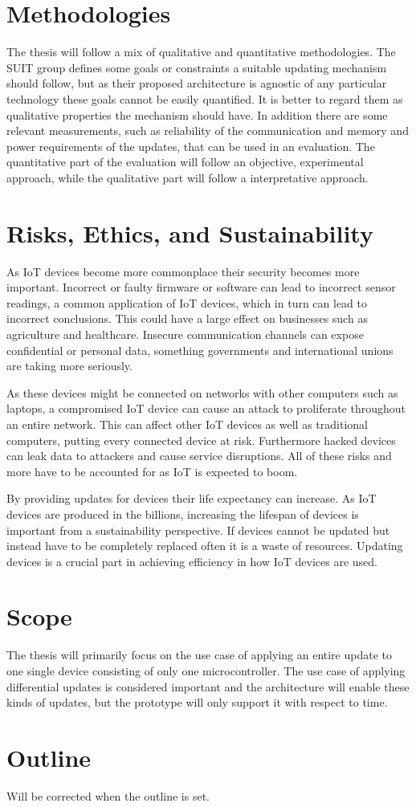 \documentclass[0-thesis.tex]{subfiles}
\begin{document}
\section{Methodologies}
The thesis will follow a mix of qualitative and quantitative methodologies. The SUIT group
defines some goals or constraints a suitable updating mechanism should follow, but as
their proposed architecture is agnostic of any particular technology these goals cannot be
easily quantified. It is better to regard them as qualitative properties the mechanism
should have. In addition there are some relevant measurements, such as reliability of the
communication and memory and power requirements of the updates, that can be used in an
evaluation. The quantitative part of the evaluation will follow an objective, experimental
approach, while the qualitative part will follow a interpretative approach.

\section{Risks, Ethics, and Sustainability}
As IoT devices become more commonplace their security becomes more important. Incorrect or
faulty firmware or software can lead to incorrect sensor readings, a common application of
IoT devices, which in turn can lead to incorrect conclusions. This could have a large
effect on businesses such as agriculture and healthcare. Insecure communication channels
can expose confidential or personal data, something governments and international unions
are taking more seriously. 

As these devices might be connected on networks with other computers such as laptops, a
compromised IoT device can cause an attack to proliferate throughout an entire network.
This can affect other IoT devices as well as traditional computers, putting every
connected device at risk. Furthermore hacked devices can leak data to attackers and cause
service disruptions. All of these risks and more have to be accounted for as IoT is
expected to boom.

By providing updates for devices their life expectancy can increase. As IoT devices are
produced in the billions, increasing the lifespan of devices is important from a
sustainability perspective. If devices cannot be updated but instead have to be completely
replaced often it is a waste of resources. Updating devices is a crucial part in achieving
efficiency in how IoT devices are used.

\section{Scope}
The thesis will primarily focus on the use case of applying an entire update to one single
device consisting of only one microcontroller. The use case of applying differential
updates is considered important and the architecture will enable these kinds of updates,
but the prototype will only support it with respect to time. 

\section{Outline}
Will be corrected when the outline is set.
\end{document}
